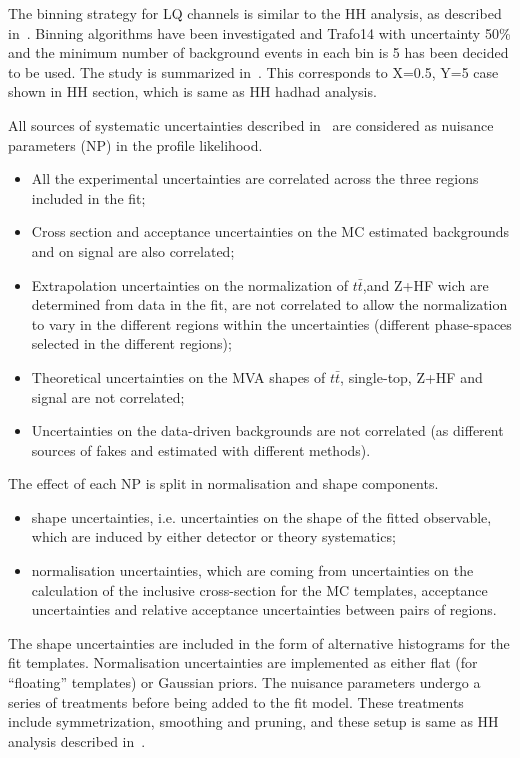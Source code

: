The binning strategy for LQ channels is similar to the HH analysis, as described in~.
Binning algorithms have been investigated and Trafo14 with uncertainty 50\% and the minimum number of background events in each bin is 5 has been decided to be used. The study is summarized in~.
This corresponds to X=0.5, Y=5 case shown in HH section, which is same as HH hadhad analysis.

All sources of systematic uncertainties described in~ are considered as nuisance parameters (NP) in the profile likelihood. 

\begin{itemize}
\item All the experimental uncertainties are correlated across the three regions included in the fit;
\item Cross section and acceptance uncertainties on the MC estimated backgrounds and on signal are also correlated;
\item Extrapolation uncertainties on the normalization of $t\bar{t}$,and Z+HF wich are determined from data in the fit, are not correlated to allow the normalization to vary in the different regions within the uncertainties (different phase-spaces selected in the different regions);
\item Theoretical uncertainties on the MVA shapes of $t\bar{t}$, single-top, Z+HF and signal are not correlated;
\item Uncertainties on the data-driven backgrounds are not correlated (as different sources of fakes and estimated with different methods).
\end{itemize}

The effect of each NP is split in normalisation and shape components.

\begin{itemize}
\item shape uncertainties, i.e. uncertainties on the shape of the fitted observable, which are induced by either detector or theory systematics;
\item normalisation uncertainties, which are coming from uncertainties on the calculation of the inclusive cross-section for the MC templates, acceptance uncertainties and relative acceptance uncertainties between pairs of regions.
\end{itemize} 

The shape uncertainties are included in the form of alternative histograms for the fit templates.
Normalisation uncertainties are implemented as either flat (for “floating” templates) or Gaussian priors.
The nuisance parameters undergo a series of treatments before being added to the fit model.
These treatments include symmetrization, smoothing and pruning, and these setup is same as HH analysis described in~.

